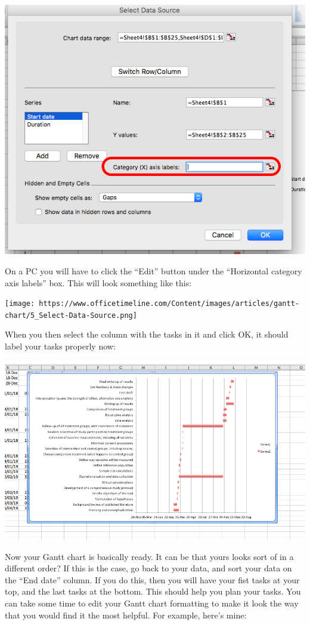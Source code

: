 \documentclass[]{book}
\theoremstyle{definition}
\theoremstyle{definition}
\theoremstyle{definition}
\theoremstyle{remark}
\begin{document}
\includegraphics{imgs/axis_labels_gantt.png}

On a PC you will have to click the ``Edit'' button under the
``Horizontal category axis labels'' box. This will look something like
this:

\texttt{[image: https://www.officetimeline.com/Content/images/articles/gantt-chart/5\_Select-Data-Source.png]}

When you then select the column with the tasks in it and click OK, it
should label your tasks properly now:

\includegraphics{imgs/gantt_labelled.png}

Now your Gantt chart is basically ready. It can be that yours looks sort
of in a different order? If this is the case, go back to your data, and
sort your data on the ``End date'' column. If you do this, then you will
have your fist tasks at your top, and the last tasks at the bottom. This
should help you plan your tasks. You can take some time to edit your
Gantt chart formatting to make it look the way that you would find it
the most helpful. For example, here's mine:
\end{document}
